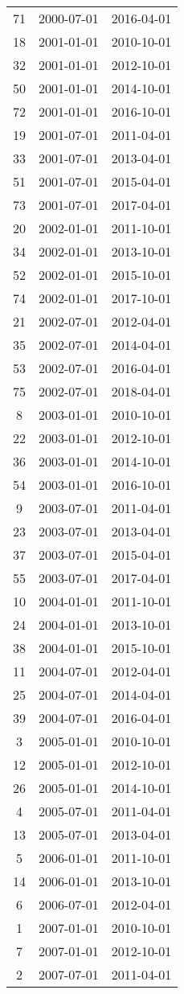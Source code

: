 \begin{tabular}{ccc}
  71 & 2000-07-01 & 2016-04-01 \\ 
  18 & 2001-01-01 & 2010-10-01 \\ 
  32 & 2001-01-01 & 2012-10-01 \\ 
  50 & 2001-01-01 & 2014-10-01 \\ 
  72 & 2001-01-01 & 2016-10-01 \\ 
  19 & 2001-07-01 & 2011-04-01 \\ 
  33 & 2001-07-01 & 2013-04-01 \\ 
  51 & 2001-07-01 & 2015-04-01 \\ 
  73 & 2001-07-01 & 2017-04-01 \\ 
  20 & 2002-01-01 & 2011-10-01 \\ 
  34 & 2002-01-01 & 2013-10-01 \\ 
  52 & 2002-01-01 & 2015-10-01 \\ 
  74 & 2002-01-01 & 2017-10-01 \\ 
  21 & 2002-07-01 & 2012-04-01 \\ 
  35 & 2002-07-01 & 2014-04-01 \\ 
  53 & 2002-07-01 & 2016-04-01 \\ 
  75 & 2002-07-01 & 2018-04-01 \\ 
  8 & 2003-01-01 & 2010-10-01 \\ 
  22 & 2003-01-01 & 2012-10-01 \\ 
  36 & 2003-01-01 & 2014-10-01 \\ 
  54 & 2003-01-01 & 2016-10-01 \\ 
  9 & 2003-07-01 & 2011-04-01 \\ 
  23 & 2003-07-01 & 2013-04-01 \\ 
  37 & 2003-07-01 & 2015-04-01 \\ 
  55 & 2003-07-01 & 2017-04-01 \\ 
  10 & 2004-01-01 & 2011-10-01 \\ 
  24 & 2004-01-01 & 2013-10-01 \\ 
  38 & 2004-01-01 & 2015-10-01 \\ 
  11 & 2004-07-01 & 2012-04-01 \\ 
  25 & 2004-07-01 & 2014-04-01 \\ 
  39 & 2004-07-01 & 2016-04-01 \\ 
  3 & 2005-01-01 & 2010-10-01 \\ 
  12 & 2005-01-01 & 2012-10-01 \\ 
  26 & 2005-01-01 & 2014-10-01 \\ 
  4 & 2005-07-01 & 2011-04-01 \\ 
  13 & 2005-07-01 & 2013-04-01 \\ 
  5 & 2006-01-01 & 2011-10-01 \\ 
  14 & 2006-01-01 & 2013-10-01 \\ 
  6 & 2006-07-01 & 2012-04-01 \\ 
  1 & 2007-01-01 & 2010-10-01 \\ 
  7 & 2007-01-01 & 2012-10-01 \\ 
  2 & 2007-07-01 & 2011-04-01 \\ 
   \hline
\end{tabular}
